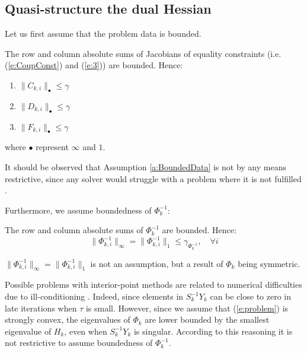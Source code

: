 \subsection{Quasi-structure the dual Hessian} \label{S:TheoreticalDecay}
Let us first assume that the problem data is bounded.
\begin{assumption} \label{a:BoundedData}
The row and column absolute sums of Jacobians of equality constraints (i.e. (\ref{e:CoupConst}) and (\ref{e:3})) are bounded. Hence:
\begin{enumerate}
\item $\| C_{k,i} \|_\bullet \leq \gamma$
\item $\| D_{k,i} \|_\bullet \leq \gamma$
\item $\| F_{k,i} \|_\bullet \leq \gamma$
\end{enumerate}
where $\bullet$ represent $\infty$ and $1$.
\end{assumption}
\begin{remark}
It should be observed that Assumption \ref{a:BoundedData} is not by any means restrictive, since any solver would struggle with a problem where it is not fulfilled \cite{}. 
\end{remark}

Furthermore, we assume boundedness of $\Phi_k^{-1}$:
\begin{assumption} \label{a:BoundedConditioning}
The row and column absolute sums of $\Phi_k^{-1}$ are bounded. Hence:
\begin{equation}
\| \Phi_{k,i}^{-1} \|_\infty = \| \Phi_{k,i}^{-1} \|_1 \leq \gamma_{\Phi_k^{-1}}, \quad \forall i
\end{equation}
\end{assumption}
\begin{remark}
$\| \Phi_{k,i}^{-1} \|_\infty = \| \Phi_{k,i}^{-1} \|_1$ is not an assumption, but a result of $\Phi_k$ being symmetric.
\end{remark}
\begin{remark}
Possible problems with interior-point methods are related to numerical difficulties due to ill-conditioning \cite{WrightM1998}. Indeed, since elements in $S_k^{-1}Y_k$ can be close to zero in late iterations when $\tau$ is small. However, since we assume that (\ref{e:problem}) is strongly convex, the eigenvalues of $\Phi_k$ are lower bounded by the smallest eigenvalue of $H_k$, even when $S_k^{-1}Y_k$ is singular. According to this reasoning it is not restrictive to assume boundedness of $\Phi_k^{-1}$.
\end{remark}

